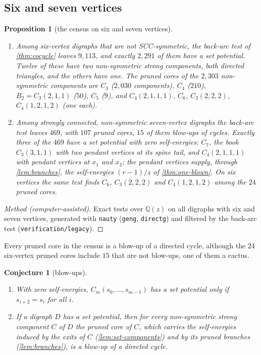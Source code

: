\documentclass[11pt]{amsart}
\theoremstyle{plain}
\newtheorem{proposition}[theorem]{Proposition}
\newtheorem{conjecture}[theorem]{Conjecture}
\theoremstyle{definition}
\theoremstyle{remark}
\numberwithin{equation}{section}
\newcommand{\code}[1]{{\ttfamily\nolinkurl{#1}}}
\newcommand{\QQ}{\mathbb{Q}}
\newcommand{\Qz}{\QQ(z)}
\begin{document}
\subsection{Six and seven vertices}

\begin{proposition}[the census on six and seven vertices]\label{prop:census67}
\begin{enumerate}[label=\textup{(\arabic*)}]
\item Among six-vertex digraphs that are not SCC-symmetric, the back-arc test of \cref{thm:cocycle} leaves $9{,}113$, and exactly $2{,}291$ of them have a set potential. Twelve of these have two non-symmetric strong components, both directed triangles, and the others have one. The pruned cores of the $2{,}303$ non-symmetric components are $C_3$ ($2{,}030$ components), $C_4$ ($210$), $B_2=C_3(2,1,1)$ ($50$), $C_5$ ($9$), and $C_4(2,1,1,1)$, $C_6$, $C_3(2,2,2)$, $C_4(1,2,1,2)$ (one each).
\item Among strongly connected, non-symmetric seven-vertex digraphs the back-arc test leaves $469$, with $107$ pruned cores, $15$ of them blow-ups of cycles. Exactly three of the $469$ have a set potential with zero self-energies: $C_7$, the book $C_3(3,1,1)$ with two pendant vertices at its spine tail, and $C_4(2,1,1,1)$ with pendant vertices at $x_1$ and $x_2$; the pendant vertices supply, through \cref{lem:branches}, the self-energies $(r-1)/z$ of \cref{thm:one-blown}. On six vertices the same test finds $C_6$, $C_3(2,2,2)$ and $C_4(1,2,1,2)$ among the $24$ pruned cores.
\end{enumerate}
\end{proposition}
\begin{proof}[Method \textup{(computer-assisted)}]
Exact tests over $\Qz$ on all digraphs with six and seven vertices, generated with \code{nauty} (\code{geng}, \code{directg}) and filtered by the back-arc test (\code{verification/legacy}).
\end{proof}

Every pruned core in the census is a blow-up of a directed cycle, although the $24$ six-vertex pruned cores include $15$ that are not blow-ups, one of them a cactus.

\begin{conjecture}[blow-ups]\label{conj:blowups}
\begin{enumerate}[label=\textup{(\arabic*)}]
\item With zero self-energies, $C_m(s_0,\dots,s_{m-1})$ has a set potential only if $s_{i+2}=s_i$ for all $i$.
\item If a digraph $D$ has a set potential, then for every non-symmetric strong component $C$ of $D$ the pruned core of $C$, which carries the self-energies induced by the exits of $C$ (\cref{lem:set-components}) and by its pruned branches (\cref{lem:branches}), is a blow-up of a directed cycle.
\end{enumerate}
\end{conjecture}
\end{document}
